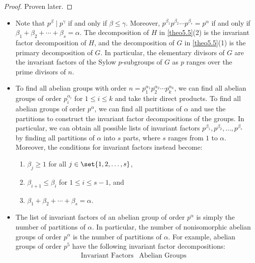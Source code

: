 \begin{proof}
    Proven later.
\end{proof}

\begin{ex}
    \begin{itemize}
        \item Note that $p^\beta \mid p^\gamma$ if and only if $\beta \leq \gamma$. Moreover, $p^{\beta_1} p^{\beta_2} \cdots p^{\beta_s} = p^\alpha$ if and only if $\beta_1 + \beta_2 + \cdots + \beta_s = \alpha$. The decomposition of $H$ in \autoref{theo5.5}(2) is the invariant factor decomposition of $H$, and the decomposition of $G$ in \autoref{theo5.5}(1) is the primary decomposition of $G$. In particular, the elementary divisors of $G$ are the invariant factors of the Sylow $p$-subgroups of $G$ as $p$ ranges over the prime divisors of $n$.
        \item To find all abelian groups with order $n = p_1^{\alpha_1} p_2^{\alpha_2} \cdots p_k^{\alpha_k}$, we can find all abelian groups of order $p_i^{\alpha_i}$ for $1 \leq i \leq k$ and take their direct products. To find all abelian groups of order $p^\alpha$, we can find all partitions of $\alpha$ and use the partitions to construct the invariant factor decompositions of the groups. In particular, we can obtain all possible lists of invariant factors $p^{\beta_1}, p^{\beta_2}, \ldots, p^{\beta_s}$ by finding all partitions of $\alpha$ into $s$ parts, where $s$ ranges from $1$ to $\alpha$. Moreover, the conditions for invariant factors instead become:
        \begin{enumerate}
            \item $\beta_j \geq 1$ for all $j \in \set{1, 2, \ldots, s}$,
            \item $\beta_{i + 1} \leq \beta_i$ for $1 \leq i \leq s - 1$, and
            \item $\beta_1 + \beta_2 + \cdots + \beta_s = \alpha$.
        \end{enumerate}
        \item The list of invariant factors of an abelian group of order $p^\alpha$ is simply the number of partitions of $\alpha$. In particular, the number of nonisomorphic abelian groups of order $p^\alpha$ is the number of partitions of $\alpha$. For example, abelian groups of order $p^5$ have the following invariant factor decompositions:
        \[
        \begin{array}{c|c}
            \text{Invariant Factors} & \text{Abelian Groups} \\

\end{array}\]
\end{itemize}
\end{ex}
